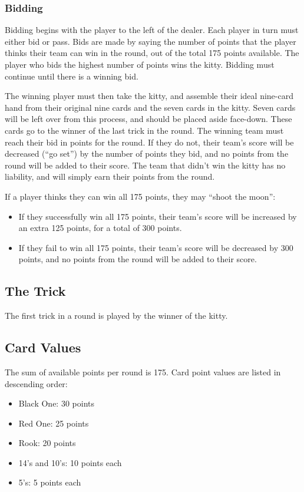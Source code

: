 \documentclass[10pt]{article}
\begin{document}
\subsubsection{Bidding}

Bidding begins with the player to the left of the dealer.
Each player in turn must either bid or pass.
Bids are made by saying the number of points that the player thinks their team can win in the round, out of the total 175 points available.
The player who bids the highest number of points wins the kitty.
Bidding must continue until there is a winning bid.

The winning player must then take the kitty, and assemble their ideal nine-card hand from their original nine cards and the seven cards in the kitty.
Seven cards will be left over from this process, and should be placed aside face-down. These cards go to the winner of the last trick in the round.
The winning team must reach their bid in points for the round. If they do not, their team's score will be decreased (``go set'') by the number of points they bid, and no points from the round will be added to their score.
The team that didn't win the kitty has no liability, and will simply earn their points from the round.

If a player thinks they can win all 175 points, they may ``shoot the moon'':
\begin{itemize}
    \item If they successfully win all 175 points, their team's score will be increased by an extra 125 points, for a total of 300 points.
    \item If they fail to win all 175 points, their team's score will be decreased by 300 points, and no points from the round will be added to their score.
\end{itemize}

\subsection{The Trick}

The first trick in a round is played by the winner of the kitty.

\subsection{Card Values}

The sum of available points per round is 175.
Card point values are listed in descending order:
\begin{itemize}
    \item Black One: 30 points
    \item Red One: 25 points
    \item Rook: 20 points
    \item 14's and 10's: 10 points each
    \item 5's: 5 points each
\end{itemize}
\end{document}
